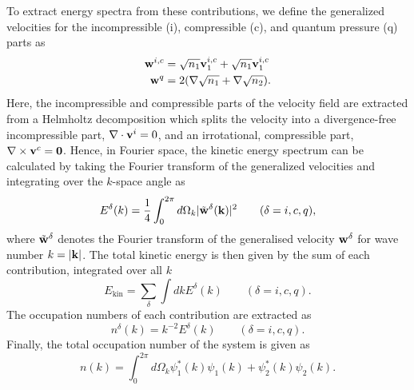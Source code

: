 To extract energy spectra from these contributions, we define the generalized
velocities for the incompressible (i), compressible (c), and quantum pressure
(q) parts as
\begin{equation}
    \begin{aligned}
        \vb{w}^{i, c} &= \sqrt{n_1}\vb{v}_1^{i, c} + \sqrt{n_1}\vb{v}_1^{i, c}
        \\
        \vb{w}^q &= 2 (\nabla \sqrt{n_1} + \nabla \sqrt{n_2}).
    \end{aligned}
\end{equation}
Here, the incompressible and compressible parts of the velocity field are
extracted from a Helmholtz decomposition which splits the velocity into a 
divergence-free incompressible part, \(\nabla \cdot \vb{v}^i = 0\), and an 
irrotational, compressible part, \(\nabla \times \vb{v}^c=\vb{0}\).
Hence, in Fourier space, the kinetic energy spectrum can be calculated by
taking the Fourier transform of the generalized velocities and integrating over
the \(k\)-space angle as
\begin{equation}
    E^\delta(k) = \frac{1}{4} \int_{0}^{2\pi} d\Omega_k
    |\tilde{\vb{w}}^\delta(\vb{k})|^2
    \qquad (\delta = i, c, q),
\end{equation}
where \(\tilde{\vb{w}}^\delta \) denotes the Fourier transform of the generalised
velocity \(\vb{w}^\delta \) for wave number \(k=|\vb{k}|\).
The total kinetic energy is then given by the sum of each contribution,
integrated over all \(k\)
\begin{equation}
    E_\mathrm{kin} = \sum_\delta \int dk E^\delta (k) \qquad (\delta = i, c, q).
\end{equation}
The occupation numbers of each contribution are extracted as
\begin{equation}
    n^\delta(k) = k^{-2}E^\delta(k) \qquad (\delta = i, c, q).
\end{equation}
Finally, the total occupation number of the system is given as
\begin{equation}
    n(k) = \int_{0}^{2\pi} d\Omega_k \psi_1^*(k)\psi_1(k) 
    + \psi_2^*(k)\psi_2(k).
\end{equation}

